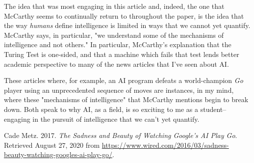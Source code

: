 \documentclass{article}
\begin{document}
  
  \graphicspath{{./images/}}
\par The idea that was most engaging in this article and, indeed, the one that McCarthy seems to continually return to throughout the paper, is the idea that the way \textit{humans} define intelligence is limited in ways that we cannot yet quantify. 
McCarthy says, in particular, "we understand some of the mechanisms of intelligence and not others." 
In particular, McCarthy's explanation that the Turing Test is one-sided, and that a machine which fails that test lends better academic perspective to many of the news articles that I've seen about AI. 
\par These articles where, for example, an AI program defeats a world-champion \textit{Go} player using an unprecedented sequence of moves \cite{GoAiWired} are instances, in my mind, where these "mechanisms of intelligence" that McCarthy mentions begin to break down. 
Both speak to why AI, as a field, is so exciting to me as a student--engaging in the pursuit of intelligence that we can't yet quantify.
\\[0.5in]

\begin{thebibliography}{9}
  Cade Metz. 2017.
  \textit{The Sadness and Beauty of Watching Google's AI Play Go}. 
  Retrieved August 27, 2020 from \url{https://www.wired.com/2016/03/sadness-beauty-watching-googles-ai-play-go/}.
  
  \end{thebibliography}
\end{document}

